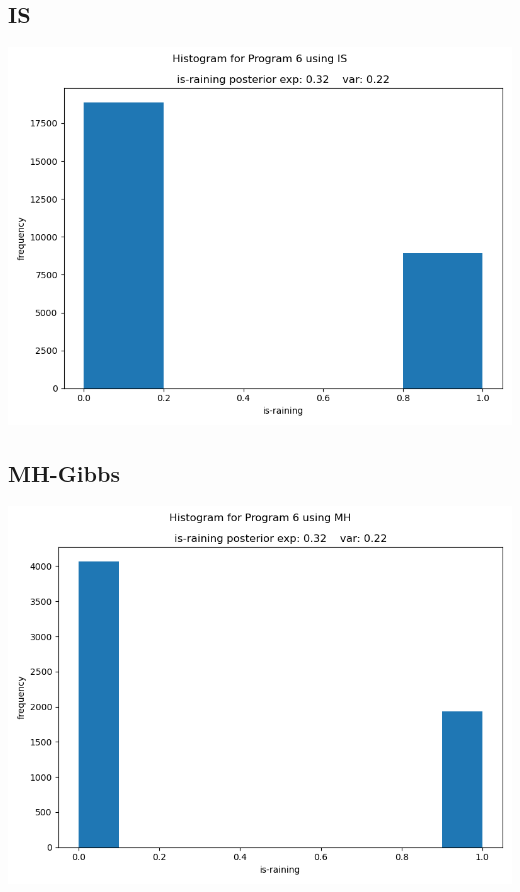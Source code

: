 \documentclass[10pt]{homeworg}
\begin{document}
\subsection{IS}
\begin{center}
\includegraphics[scale=0.5]{figures/IS_program_6.png}
\end{center}

\subsection{MH-Gibbs}
\begin{center}
\includegraphics[scale=0.5]{figures/MH_program_6.png}
\end{center}
\end{document}
